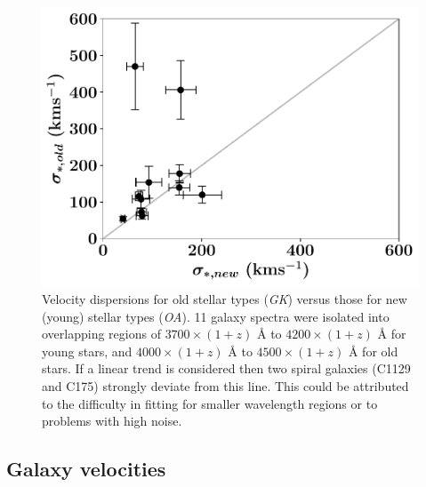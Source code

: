 \documentclass[12pt, twocolumn]{revtex4-1}    %
\begin{document}



\begin{figure}
\includegraphics[width=1.0\linewidth]{data/sigma_stars_old_vs_new}
\caption{Velocity dispersions for old stellar types (\textit{GK}) versus those for new (young) stellar types (\textit{OA}). 11 galaxy spectra were isolated into overlapping regions of $3700\times (1+z)$ {\AA} to $4200\times(1+z)$ {\AA} for young stars, and $4000\times (1+z)$ {\AA} to $4500\times(1+z)$ {\AA} for old stars. If a linear trend is considered then two spiral galaxies (C1129 and C175) strongly deviate from this line. This could be attributed to the difficulty in fitting for smaller wavelength regions or to problems with high noise. }
\label{fig:velocity_dispersions_old_new}
\end{figure} 


\subsection{Galaxy velocities}
\end{document}
